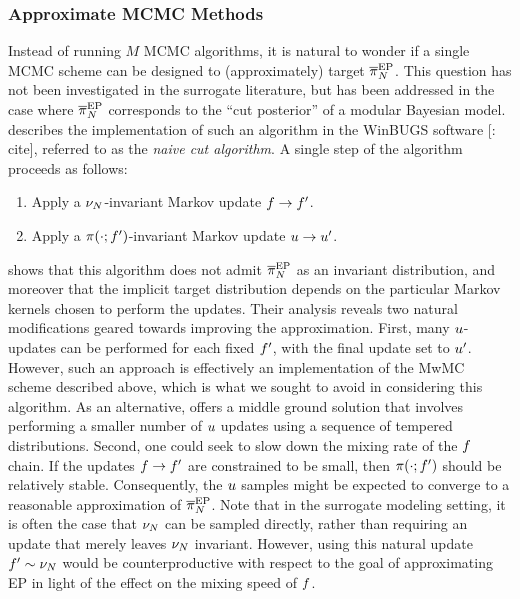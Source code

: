 \documentclass[12pt]{article}
\begin{document}
\subsubsection{Approximate MCMC Methods}
Instead of running $M$ MCMC algorithms, it is natural to wonder if a single MCMC scheme can be designed
to (approximately) target $\overline{\pi}_{N}^{\mathrm{EP}}$. This question has not been investigated in the surrogate 
literature, but has been addressed in the case where $\overline{\pi}_{N}^{\mathrm{EP}}$ corresponds to the ``cut posterior''
of a modular Bayesian model. \citet{PlummerCut} describes the implementation of such an algorithm 
in the WinBUGS software [\todo: cite], referred to as the \textit{naive cut algorithm}.
A single step of the algorithm proceeds as follows:
\begin{enumerate}
\item Apply a $\nu_{N}$-invariant Markov update $f \to f^\prime$.
\item Apply a $\pi(\cdot; f^\prime)$-invariant Markov update $u \to u^\prime$.
\end{enumerate}
\citet{PlummerCut} shows that this algorithm does not admit $\overline{\pi}_{N}^{\mathrm{EP}}$ as an invariant
distribution, and moreover that the implicit target distribution depends on the particular Markov kernels
chosen to perform the updates. Their analysis reveals two natural modifications geared towards 
improving the approximation. 
First, many $u$-updates can be performed for each fixed $f^\prime$, with the final update
set to $u^\prime$. However, such an approach is effectively an implementation of the MwMC scheme
described above, which is what we sought to avoid in considering this algorithm. As an alternative,
\citet{PlummerCut} offers a middle ground solution that involves performing a smaller number of 
$u$ updates using a sequence of tempered distributions.
Second, one could seek to slow down the mixing rate of the $f$ chain. 
If the updates  $f \to f^\prime$ are constrained to be small, then 
$\pi(\cdot; f^\prime)$ should be relatively stable. Consequently,
the $u$ samples might be expected to converge to a reasonable approximation of $\overline{\pi}_{N}^{\mathrm{EP}}$.
Note that in the surrogate modeling setting, it is often the case that $\nu_{N}$ can be sampled directly,
rather than requiring an update that merely leaves $\nu_{N}$ invariant. However, using this natural 
update $f^\prime \sim \nu_{N}$ would be counterproductive with respect to the goal
of approximating EP in light of the effect on the mixing speed of $f$.
\end{document}
